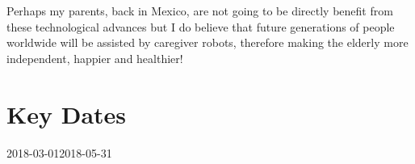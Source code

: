 \documentclass[12pt]{article}
\begin{document}
Perhaps my parents, back in Mexico, are not going to be directly benefit 
from these technological advances 
but I do believe that 
future generations of people worldwide
will be assisted by caregiver robots,
therefore making the elderly more independent, happier and healthier!


\newpage



\section*{Key Dates} 

\begin{ganttchart}[
	hgrid,
	vgrid,
	x unit=1mm,
	time slot format=isodate-yearmonth
	]{2018-03-01}{2018-05-31}
 \\
 \\
 \\
 \\

 \\
 \\
 \\
\end{ganttchart}








\end{document}
